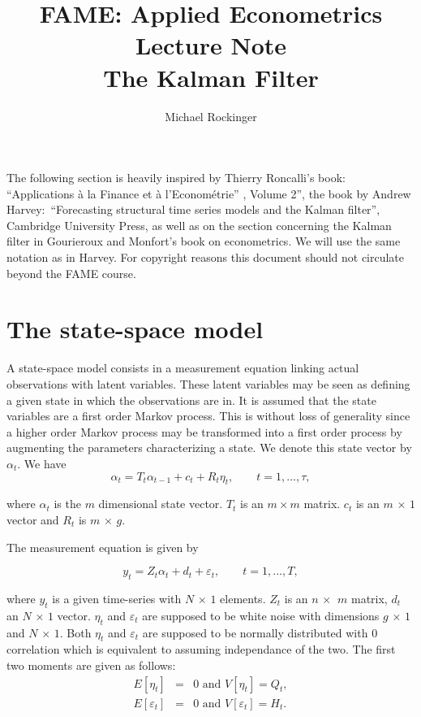 \documentclass[12pt,a4paper]{article}
\begin{document}
\title{FAME: Applied Econometrics\\
Lecture Note\\
The Kalman Filter}
\author{Michael Rockinger}
\maketitle

The following section is heavily inspired by Thierry Roncalli's book:
``Applications \`{a} la Finance et \`{a} l'Econom\'{e}trie\textquotedblright
, Volume 2\textquotedblright , the book by Andrew Harvey:\ ``Forecasting
structural time series models and the Kalman filter\textquotedblright ,
Cambridge University Press, as well as on the section concerning the Kalman
filter in Gourieroux and Monfort's book on econometrics. We will use the
same notation as in Harvey. For copyright reasons this document should not
circulate beyond the FAME course.

\section{The state-space model}

A state-space model consists in a measurement equation linking actual
observations with latent variables. These latent variables may be seen as
defining a given state in which the observations are in. It is assumed that
the state variables are a first order Markov process. This is without loss
of generality since a higher order Markov process may be transformed into a
first order process by augmenting the parameters characterizing a state. We
denote this state vector by $\alpha _{t}$. We have%
\begin{equation*}
\alpha _{t}=T_{t}\alpha _{t-1}+c_{t}+R_{t}\eta _{t},\qquad t=1,...,\tau ,
\end{equation*}

where $\alpha _{t}$ is the $m$ dimensional state vector. $T_{t}$ is an $%
m\times m$ matrix. $c_{t}$ is an $m$ $\times $ $1$ vector and $R_{t}$ is $m$
$\times $ $g$.

The measurement equation is given by

\begin{equation*}
y_{t}=Z_{t}\alpha _{t}+d_{t}+\varepsilon _{t},\qquad t=1,...,T,
\end{equation*}

where $y_{t}$ is a given time-series with $N$ $\times $ $1$ elements. $Z_{t}$
is an $n$ $\times $ $\ m$ matrix, $d_{t}$ an $N$ $\times $ $1$ vector. $\eta
_{t}$ and $\varepsilon _{t}$ are supposed to be white noise with dimensions $%
g$ $\times $ $1$ and $N$ $\times $ $1$. Both $\eta _{t}$ and $\varepsilon
_{t}$ are supposed to be normally distributed with $0$ correlation which is
equivalent to assuming independance of the two. The first two moments are
given as follows:%
\begin{eqnarray*}
E[\eta _{t}] &=&0\text{ and }V[\eta _{t}]=Q_{t}, \\
E[\varepsilon _{t}] &=&0\text{ and }V[\varepsilon _{t}]=H_{t}.
\end{eqnarray*}
\end{document}
